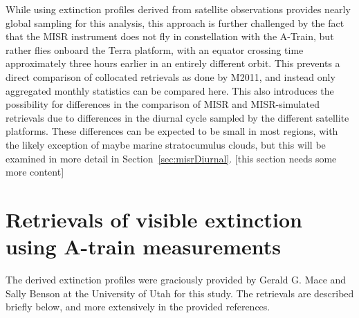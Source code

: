 While using extinction profiles derived from satellite observations
provides nearly global sampling for this analysis, this approach is
further challenged by the fact that the MISR instrument does not fly in
constellation with the A-Train, but rather flies onboard the Terra
platform, with an equator crossing time approximately three hours
earlier in an entirely different orbit. This prevents a direct
comparison of collocated retrievals as done by M2011, and instead only
aggregated monthly statistics can be compared here. This also introduces
the possibility for differences in the comparison of MISR and
MISR-simulated retrievals due to differences in the diurnal cycle
sampled by the different satellite platforms. These differences can be
expected to be small in most regions, with the likely exception of maybe
marine stratocumulus clouds, but this will be examined in more detail in
Section~\ref{sec:misrDiurnal}. {[}this section needs some more
content{]}

\section{Retrievals of visible extinction using A-train
measurements}\label{sec:ccRetrievals}

The derived extinction profiles were graciously provided by Gerald G.
Mace and Sally Benson at the University of Utah for this study. The
retrievals are described briefly below, and more extensively in the
provided references.

